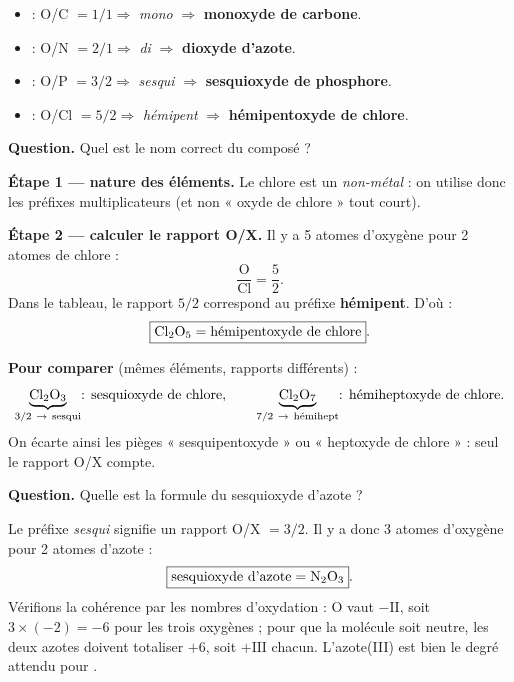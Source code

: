 \documentclass[11pt,a4paper]{article}
\begin{document}
\begin{exemple}
\begin{itemize}[leftmargin=1.6em,topsep=2pt,itemsep=2pt]
  \item {} : O/C $= 1/1 \Rightarrow$ \emph{mono} $\Rightarrow$ \textbf{monoxyde de carbone}.
  \item {} : O/N $= 2/1 \Rightarrow$ \emph{di} $\Rightarrow$ \textbf{dioxyde d'azote}.
  \item {} : O/P $= 3/2 \Rightarrow$ \emph{sesqui} $\Rightarrow$ \textbf{sesquioxyde de phosphore}.
  \item {} : O/Cl $= 5/2 \Rightarrow$ \emph{hémipent} $\Rightarrow$ \textbf{hémipentoxyde de chlore}.
\end{itemize}
\end{exemple}

\begin{exemple}
\textbf{Question.} Quel est le nom correct du composé  ?

\smallskip
\textbf{Étape 1 — nature des éléments.} Le chlore est un \emph{non-métal} : on utilise donc les préfixes
multiplicateurs (et non « oxyde de chlore » tout court).

\textbf{Étape 2 — calculer le rapport O/X.} Il y a 5 atomes d'oxygène pour 2 atomes de chlore :
\[ \frac{\text{O}}{\text{Cl}} = \frac{5}{2}. \]
Dans le tableau, le rapport $5/2$ correspond au préfixe \textbf{hémipent}. D'où :
\[ \boxed{\ce{Cl2O5} = \text{hémipentoxyde de chlore}}. \]

\textbf{Pour comparer} (mêmes éléments, rapports différents) :
\[ \underbrace{\ce{Cl2O3}}_{3/2\ \to\ \text{sesqui}}\!\!\!\text{ : sesquioxyde de chlore}, \qquad
   \underbrace{\ce{Cl2O7}}_{7/2\ \to\ \text{hémihept}}\!\!\!\text{ : hémiheptoxyde de chlore}. \]
On écarte ainsi les pièges « sesquipentoxyde » ou « heptoxyde de chlore » : seul le rapport O/X compte.
\end{exemple}

\begin{exemple}
\textbf{Question.} Quelle est la formule du sesquioxyde d'azote ?

\smallskip
Le préfixe \emph{sesqui} signifie un rapport O/X $= 3/2$. Il y a donc 3 atomes d'oxygène pour 2 atomes
d'azote :
\[ \boxed{\text{sesquioxyde d'azote} = \ce{N2O3}}. \]
Vérifions la cohérence par les nombres d'oxydation : O vaut $-\mathrm{II}$, soit $3\times(-2)=-6$ pour les
trois oxygènes ; pour que la molécule soit neutre, les deux azotes doivent totaliser $+6$, soit
$+\mathrm{III}$ chacun. L'azote(III) est bien le degré attendu pour .
\end{exemple}
\end{document}
